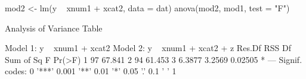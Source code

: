 \begin{Schunk}
\begin{Sinput}
 mod2 <- lm(y ~ xnum1 + xcat2, data = dat)
 anova(mod2, mod1, test = "F")
\end{Sinput}
\begin{Soutput}
Analysis of Variance Table

Model 1: y ~ xnum1 + xcat2
Model 2: y ~ xnum1 + xcat2 + z
  Res.Df    RSS Df Sum of Sq      F  Pr(>F)  
1     97 67.841                              
2     94 61.453  3    6.3877 3.2569 0.02505 *
---
Signif. codes:  0 '***' 0.001 '**' 0.01 '*' 0.05 '.' 0.1 ' ' 1
\end{Soutput}
\end{Schunk}

